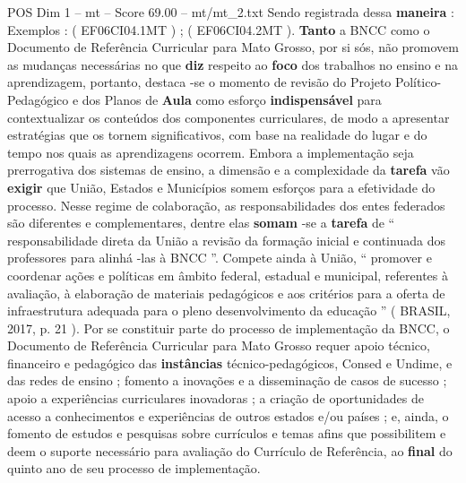 \begin{textsample}{POS Dim 1 – mt – Score 69.00 – mt/mt\_2.txt}
Sendo registrada dessa \textbf{maneira} : Exemplos : ( EF06CI04.1MT ) ; ( EF06CI04.2MT ). \textbf{Tanto} a BNCC como o Documento de Referência Curricular para Mato Grosso, por si sós, não promovem as mudanças necessárias no que \textbf{diz} respeito ao \textbf{foco} dos trabalhos no ensino e na aprendizagem, portanto, destaca -se o momento de revisão do Projeto Político-Pedagógico e dos Planos de \textbf{Aula} como esforço \textbf{indispensável} para contextualizar os conteúdos dos componentes curriculares, de modo a apresentar estratégias que os tornem significativos, com base na realidade do lugar e do tempo nos quais as aprendizagens ocorrem.
Embora a implementação seja prerrogativa dos sistemas de ensino, a dimensão e a complexidade da \textbf{tarefa} vão \textbf{exigir} que União, Estados e Municípios somem esforços para a efetividade do processo.
Nesse regime de colaboração, as responsabilidades dos entes federados são diferentes e complementares, dentre elas \textbf{somam} -se a \textbf{tarefa} de “ responsabilidade direta da União a revisão da formação inicial e continuada dos professores para alinhá -las à BNCC ”.
Compete ainda à União, “ promover e coordenar ações e políticas em âmbito federal, estadual e municipal, referentes à avaliação, à elaboração de materiais pedagógicos e aos critérios para a oferta de infraestrutura adequada para o pleno desenvolvimento da educação ” ( BRASIL, 2017, p. 21 ).
Por se constituir parte do processo de implementação da BNCC, o Documento de Referência Curricular para Mato Grosso requer apoio técnico, financeiro e pedagógico das \textbf{instâncias} técnico-pedagógicos, Consed e Undime, e das redes de ensino ; fomento a inovações e a disseminação de casos de sucesso ; apoio a experiências curriculares inovadoras ; a criação de oportunidades de acesso a conhecimentos e experiências de outros estados e/ou países ; e, ainda, o fomento de estudos e pesquisas sobre currículos e temas afins que possibilitem e deem o suporte necessário para avaliação do Currículo de Referência, ao \textbf{final} do quinto ano de seu processo de implementação.

\end{textsample}
